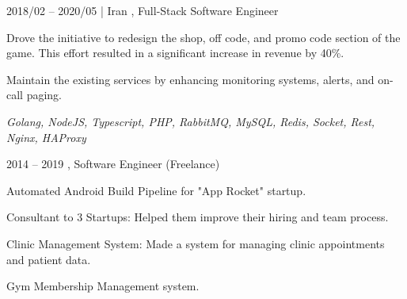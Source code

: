     \begin{twocolentry}{2018/02 -- 2020/05 | Iran}
        ,
        Full-Stack Software Engineer
    \end{twocolentry}
    \begin{onecolentry}
        \begin{highlights}
            \item Drove the initiative to redesign the shop, off code, and promo code section of the game. This effort resulted in a significant increase in revenue by 40\%.
            \item Maintain the existing services by enhancing monitoring systems, alerts, and on-call paging.
        \end{highlights}
        \textit{Golang, NodeJS, Typescript, PHP, RabbitMQ, MySQL, Redis, Socket, Rest, Nginx, HAProxy}
    \end{onecolentry}
    \vspace{0.3cm}


    \begin{twocolentry}{2014 -- 2019}
        ,
        Software Engineer (Freelance)
    \end{twocolentry}
    \begin{onecolentry}
        \begin{highlights}
            \item Automated Android Build Pipeline for "App Rocket" startup.
            \item Consultant to 3 Startups: Helped them improve their hiring and team process.
            \item Clinic Management System: Made a system for managing clinic appointments and patient data.
            \item Gym Membership Management system.
        \end{highlights}
    \end{onecolentry}
